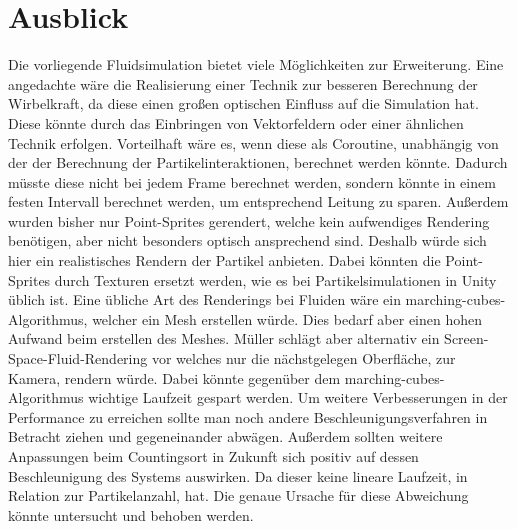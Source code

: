 \documentclass[intern,palatino]{cgBA}
\begin{document}
\section{Ausblick}\label{ausblick}

Die vorliegende Fluidsimulation bietet viele Möglichkeiten zur Erweiterung. Eine angedachte wäre die Realisierung einer Technik zur besseren Berechnung der Wirbelkraft, da diese einen großen optischen Einfluss auf die Simulation hat. Diese könnte durch das Einbringen von Vektorfeldern oder einer ähnlichen Technik erfolgen. Vorteilhaft wäre es, wenn diese als Coroutine, unabhängig von der der Berechnung der Partikelinteraktionen, berechnet werden könnte. Dadurch müsste diese nicht bei jedem Frame berechnet werden, sondern könnte in einem festen Intervall berechnet werden, um entsprechend Leitung zu sparen.
\newline
Außerdem wurden bisher nur Point-Sprites gerendert, welche kein aufwendiges Rendering benötigen, aber nicht besonders optisch ansprechend sind. Deshalb würde sich hier ein realistisches Rendern der Partikel anbieten. Dabei könnten die Point-Sprites durch Texturen ersetzt werden, wie es bei Partikelsimulationen in Unity üblich ist. Eine übliche Art des Renderings bei Fluiden wäre ein marching-cubes-Algorithmus, welcher ein Mesh erstellen würde. Dies bedarf aber einen hohen Aufwand beim erstellen des Meshes. Müller \cite{muller2007screen} schlägt aber alternativ ein Screen-Space-Fluid-Rendering vor welches nur die nächstgelegen Oberfläche, zur Kamera, rendern würde. Dabei könnte gegenüber dem marching-cubes-Algorithmus wichtige Laufzeit gespart werden.
\newline
Um weitere Verbesserungen in der Performance zu erreichen sollte man noch andere Beschleunigungsverfahren in Betracht ziehen und gegeneinander abwägen. Außerdem sollten weitere Anpassungen beim Countingsort in Zukunft sich positiv auf dessen Beschleunigung des Systems auswirken. Da dieser keine lineare Laufzeit, in Relation zur Partikelanzahl, hat. Die genaue Ursache für diese Abweichung könnte untersucht und behoben werden.

\newpage
\listoffigures
\newpage

\end{document}
